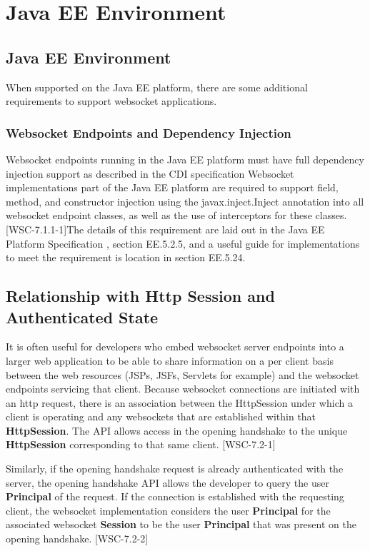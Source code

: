 \chapter{Java EE Environment}
\label{javaee}

\section{Java EE Environment}

When supported on the Java EE platform, there are some additional requirements to support websocket applications.

\subsection{Websocket Endpoints and Dependency Injection}

Websocket endpoints running in the Java EE platform must have full dependency injection support as described in the CDI specification \cite{jsr347} Websocket implementations part of the Java EE platform are required to support field, method, and constructor injection using the javax.inject.Inject annotation into all websocket endpoint classes, as well as the use of interceptors for these classes. [WSC-7.1.1-1]The details of this requirement are laid out in the Java EE Platform Specification \cite{jsr342}, section EE.5.2.5, and a useful guide for implementations to meet the requirement is location in section EE.5.24.

\section{Relationship with Http Session and Authenticated State}
\label{javaee:httpsession}

It is often useful for developers who embed websocket server endpoints into a larger web application to be able to share information on a per client basis between the web resources (JSPs, JSFs, Servlets for example) and the websocket endpoints servicing that client. Because websocket connections are initiated with an http request, there is an association between the HttpSession under which a client is operating and any websockets that are established within that \textbf{HttpSession}. The API allows access in the opening handshake to the unique \textbf{HttpSession} corresponding to that same client. [WSC-7.2-1] 

Similarly, if the opening handshake request is already authenticated with the server, the opening handshake API allows the developer to query the user \textbf{Principal} of the request. If the connection is established with the requesting client, the websocket implementation considers the user \textbf{Principal} for the associated websocket \textbf{Session} to be the user \textbf{Principal} that was present on the opening handshake. [WSC-7.2-2]

